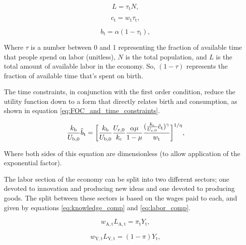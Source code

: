 \documentclass[letterpaper,12pt]{article}
\begin{document}
\begin{equation}\label{eq:pop_work}
L = \tau_\mathrm{t} N,
\end{equation}

\begin{equation} \label{eq:consumption_constraint}
c_\mathrm{t} = w_\mathrm{t} \tau_\mathrm{t},
\end{equation}

\begin{equation} \label{eq:birth_constraint}
b_\mathrm{t} = \alpha (1-\tau_\mathrm{t}),
\end{equation}

Where $\tau$ is a number between 0 and 1 representing the fraction of available time that people spend on labor (unitless), $N$ is the total population, and $L$ is the total amount of available labor in the economy. So, $(1-\tau)$ represents the fraction of available time that's spent on birth.

The time constraints, in conjunction with the first order condition, reduce the utility function down to a form that directly relates birth and consumption, as shown in equation \ref{eq:FOC_and_time_constraints}.

\begin{equation} \label{eq:FOC_and_time_constraints}
\frac{k_\mathrm{b}}{U_\mathrm{b,0}} \tilde b_\mathrm{t} = \bigg{[} \frac{k_\mathrm{b}}{U_\mathrm{b,0}} \frac{U_\mathrm{c,0}}{k_\mathrm{c}} \frac{\alpha \mu}{1-\mu} \frac{( \frac{k_\mathrm{c}}{U_\mathrm{c,0}} \tilde c_\mathrm{t} )^\gamma}{w_\mathrm{t}}\bigg{]}^{1/\eta} ,
\end{equation}

Where both sides of this equation are dimensionless (to allow application of the exponential factor).

The labor section of the economy can be split into two different sectors; one devoted to innovation and producing new ideas and one devoted to producing goods. The split between these sectors is based on the wages paid to each, and given by equations \ref{eq:knowledge_comp} and \ref{eq:labor_comp}.

\begin{equation} \label{eq:knowledge_comp}
w_\mathrm{A,t} L_\mathrm{A,t} = \pi_\mathrm{t} Y_\mathrm{t},
\end{equation}

\begin{equation} \label{eq:labor_comp}
w_\mathrm{Y,t} L_\mathrm{Y,t} = (1-\pi) Y_\mathrm{t},
\end{equation}
\end{document}
